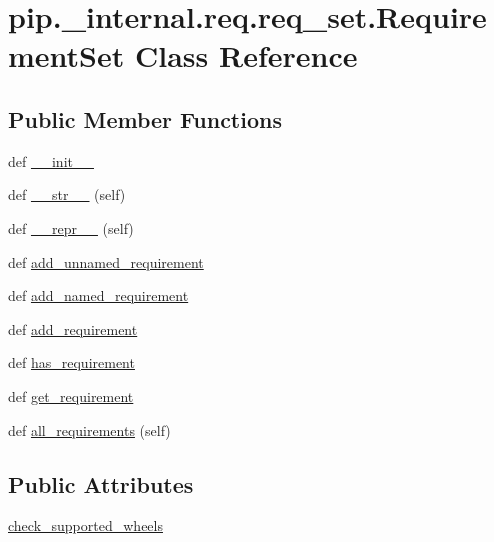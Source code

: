 \hypertarget{classpip_1_1__internal_1_1req_1_1req__set_1_1RequirementSet}{}\section{pip.\+\_\+internal.\+req.\+req\+\_\+set.\+Requirement\+Set Class Reference}
\label{classpip_1_1__internal_1_1req_1_1req__set_1_1RequirementSet}
\subsection*{Public Member Functions}
\begin{DoxyCompactItemize}
\item 
def \hyperlink{classpip_1_1__internal_1_1req_1_1req__set_1_1RequirementSet_a652631b789142752e0008f5c63aaf6a0}{\+\_\+\+\_\+init\+\_\+\+\_\+}
\item 
def \hyperlink{classpip_1_1__internal_1_1req_1_1req__set_1_1RequirementSet_a92e9cf36067086afed7d03ce82cbc746}{\+\_\+\+\_\+str\+\_\+\+\_\+} (self)
\item 
def \hyperlink{classpip_1_1__internal_1_1req_1_1req__set_1_1RequirementSet_a971cc746e84b28193a232f5243cff8c9}{\+\_\+\+\_\+repr\+\_\+\+\_\+} (self)
\item 
def \hyperlink{classpip_1_1__internal_1_1req_1_1req__set_1_1RequirementSet_aaf810c3b7d4f6a05b10d0f4813c62f27}{add\+\_\+unnamed\+\_\+requirement}
\item 
def \hyperlink{classpip_1_1__internal_1_1req_1_1req__set_1_1RequirementSet_ad7d4e29cdee4ba14e052aeb09325253c}{add\+\_\+named\+\_\+requirement}
\item 
def \hyperlink{classpip_1_1__internal_1_1req_1_1req__set_1_1RequirementSet_a365be3d7392e7e62cb711fa9ad3b4c26}{add\+\_\+requirement}
\item 
def \hyperlink{classpip_1_1__internal_1_1req_1_1req__set_1_1RequirementSet_a0b8b44613267cf6d5296823f80a155d6}{has\+\_\+requirement}
\item 
def \hyperlink{classpip_1_1__internal_1_1req_1_1req__set_1_1RequirementSet_a4cbdfe2e73632d8758dcdab117fb0963}{get\+\_\+requirement}
\item 
def \hyperlink{classpip_1_1__internal_1_1req_1_1req__set_1_1RequirementSet_a652daa5ae46d64b021bce1fc517dbbb1}{all\+\_\+requirements} (self)
\end{DoxyCompactItemize}
\subsection*{Public Attributes}
\begin{DoxyCompactItemize}
\item 
\hyperlink{classpip_1_1__internal_1_1req_1_1req__set_1_1RequirementSet_ae0cd02dd40841c8bb39d4c1b6ddd506c}{check\+\_\+supported\+\_\+wheels}
\end{DoxyCompactItemize}
